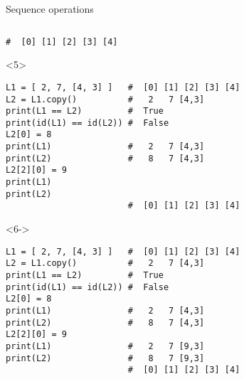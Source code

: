 \begin{frame}[fragile]{Sequence operations}
\begin{center}
\begin{columns}[onlytextwidth]
\begin{column}{\textwidth}
\begin{onlyenv}
\begin{lstlisting}[style=python,morekeywords={for, in, range, list}]
                        #  [0] [1] [2] [3] [4] \end{lstlisting}
      \end{onlyenv}

      \begin{onlyenv}<5>
        \begin{lstlisting}[style=python,morekeywords={for, in, range, list}]
L1 = [ 2, 7, [4, 3] ]   #  [0] [1] [2] [3] [4]
L2 = L1.copy()          #   2   7 [4,3]
print(L1 == L2)         #  True
print(id(L1) == id(L2)) #  False
L2[0] = 8
print(L1)               #   2   7 [4,3]
print(L2)               #   8   7 [4,3]
L2[2][0] = 9
print(L1)
print(L2)
                        #  [0] [1] [2] [3] [4] \end{lstlisting}
      \end{onlyenv}

      \begin{onlyenv}<6->
        \begin{lstlisting}[style=python,morekeywords={for, in, range, list}]
L1 = [ 2, 7, [4, 3] ]   #  [0] [1] [2] [3] [4]
L2 = L1.copy()          #   2   7 [4,3]
print(L1 == L2)         #  True
print(id(L1) == id(L2)) #  False
L2[0] = 8
print(L1)               #   2   7 [4,3]
print(L2)               #   8   7 [4,3]
L2[2][0] = 9
print(L1)               #   2   7 [9,3]
print(L2)               #   8   7 [9,3]
                        #  [0] [1] [2] [3] [4] \end{lstlisting}
      \end{onlyenv}

    \end{column}
  \end{columns}

  \end{center}

\end{frame}


